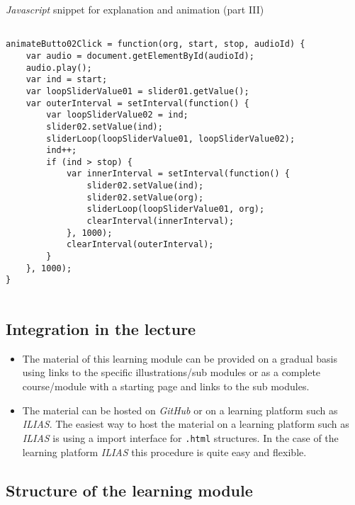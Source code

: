 \documentclass[12pt]{article}
\begin{document}
\begin{CodeSnippet}[!hp]
	\centering
	\caption{\emph{Javascript} snippet for explanation and animation (part III)}
	\vspace{0.25cm}	
	\begin{BVerbatim}
		
animateButto02Click = function(org, start, stop, audioId) {    
	var audio = document.getElementById(audioId);
	audio.play();
	var ind = start;
	var loopSliderValue01 = slider01.getValue();
	var outerInterval = setInterval(function() {
		var loopSliderValue02 = ind;
		slider02.setValue(ind);
		sliderLoop(loopSliderValue01, loopSliderValue02);
		ind++;
		if (ind > stop) {
			var innerInterval = setInterval(function() {
				slider02.setValue(ind);
				slider02.setValue(org);            
				sliderLoop(loopSliderValue01, org);
				clearInterval(innerInterval);
			}, 1000);        
			clearInterval(outerInterval);
		}
	}, 1000);
}
		
	\end{BVerbatim}
	\vspace*{-2mm}
	\label{JsCodSniAn03}
\end{CodeSnippet}

\subsection{Integration in the lecture}

\begin{itemize}
	\item The material of this learning module can be provided on a gradual basis using links to the specific illustrations/sub modules or as a complete course/module with a starting page and links to the sub modules.
	\item The material can be hosted on \emph{GitHub} or on a learning platform such as \emph{ILIAS}. The easiest way to host the material on a learning platform such as \emph{ILIAS} is using a import interface for \texttt{.html} structures. In the case of the learning platform \emph{ILIAS} this procedure is quite easy and flexible.	
\end{itemize}

\subsection{Structure of the learning module}
\end{document}
